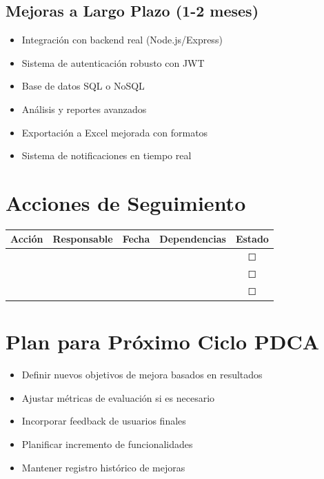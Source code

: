 \documentclass[12pt,a4paper]{report}
\begin{document}
\subsection{Mejoras a Largo Plazo (1-2 meses)}

\begin{itemize}
    \item Integración con backend real (Node.js/Express)
    \item Sistema de autenticación robusto con JWT
    \item Base de datos SQL o NoSQL
    \item Análisis y reportes avanzados
    \item Exportación a Excel mejorada con formatos
    \item Sistema de notificaciones en tiempo real
\end{itemize}

\section{Acciones de Seguimiento}

\begin{table}[h]
    \centering
    \begin{tabular}{|p{3cm}|p{3cm}|p{2cm}|p{3cm}|c|}
        \hline
        \rowcolor{grisClaro}
        \textbf{Acción} & \textbf{Responsable} & \textbf{Fecha} & \textbf{Dependencias} & \textbf{Estado} \\
        \hline
        & & & & ☐ \\
        \hline
        & & & & ☐ \\
        \hline
        & & & & ☐ \\
        \hline
    \end{tabular}
\end{table}

\section{Plan para Próximo Ciclo PDCA}

\begin{itemize}
    \item Definir nuevos objetivos de mejora basados en resultados
    \item Ajustar métricas de evaluación si es necesario
    \item Incorporar feedback de usuarios finales
    \item Planificar incremento de funcionalidades
    \item Mantener registro histórico de mejoras
\end{itemize}
\end{document}
